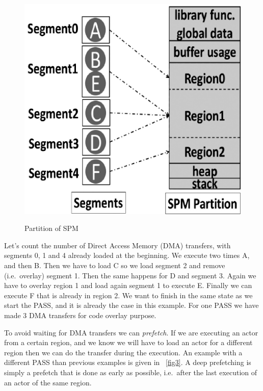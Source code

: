 \documentclass{article}
\begin{document}
\begin{figure}
\caption{Partition of SPM}
\centering
\includegraphics[scale=0.175]{fig2_2}
\label{fig2_2}
\end{figure}

Let's count the number of Direct Access Memory (DMA) transfers, with segments 0, 1 and 4 already loaded at the beginning.
We execute two times A, and then B.
Then we have to load C so we load segment 2 and remove (i.e.\ overlay) segment 1.
Then the same happens for D and segment 3.
Again we have to overlay region 1 and load again segment 1 to execute E.
Finally we can execute F that is already in region 2.
We want to finish in the same state as we start the PASS, and it is already the case in this example.
For one PASS we have made 3 DMA transfers for code overlay purpose.

To avoid waiting for DMA transfers we can \textit{prefetch}.
If we are executing an actor from a certain region, and we know we will have to load an actor for a different region then we can do the transfer during the execution.
An example with a different PASS than previous examples is given in \figurename~\ref{fig3}.
A deep prefetching is simply a prefetch that is done as early as possible, i.e.\ after the last execution of an actor of the same region.
\end{document}
